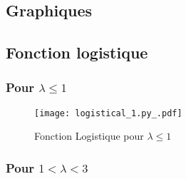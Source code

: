 \begin{appendices}
    \renewcommand\thefigure{\thesection.\arabic{figure}}
    \appendixheaderon
    \section{Graphiques}
    \label{ann:graphiques}

    \subsection{Fonction logistique}
    \subsubsection{Pour \texorpdfstring{$\lambda \leq 1$}{Lg}}
    \begin{figure}[ht]
        \centering
        \label{ann:graphique_1}
        \texttt{[image: logistical\_1.py\_.pdf]}
        \caption{Fonction Logistique pour $\lambda \leq 1$}
    \end{figure}

    \subsubsection{Pour \texorpdfstring{$1 < \lambda < 3$}{Lg}}

\end{appendices}